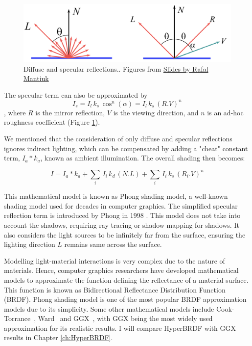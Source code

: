\begin{figure}[h]
  \centering
   \includegraphics[width=0.5\linewidth]{Images/diffuse+specular+angle.pdf}
   \caption{Diffuse and specular reflections.. Figures from \href{https://www.cl.cam.ac.uk/teaching/2223/Graphics/Introduction_to_Graphics_1pp.pdf}{Slides by Rafal Mantiuk}}
   \label{fig:diffuse-spec-angle}
\end{figure}

The specular term can also be approximated by $$I_s = I_l \, k_s \, \cos^n(\alpha) = I_l \, k_s \, (R . V)^n $$, where $R$ is the mirror reflection, $V$ is the viewing direction, and $n$ is an ad-hoc roughness coefficient (Figure \ref{fig:diffuse-spec-angle}).


We mentioned that the consideration of only diffuse and specular reflections ignores indirect lighting, which can be compensated by adding a "cheat" constant term, $I_a * k_a$, known as ambient illumination. The overall shading then becomes:

\begin{equation}
I = I_a * k_a + \sum_i \, I_i \, k_d \, (N . L) + \sum_i \, I_i \, k_s \, (R_i . V)^n
\label{eq:Phong-eq}
\end{equation}

This mathematical model is known as Phong shading model, a well-known shading model used for decades in computer graphics. The simplified specular reflection term is introduced by Phong in 1998 \cite{phong1998illumination}. This model does not take into account the shadows, requiring ray tracing or  shadow mapping for shadows. It also considers the light sources to be infinitely far from the surface, ensuring the lighting direction $L$ remains same across the surface.

Modelling light-material interactions is very complex due to the nature of materials. Hence, computer graphics researchers have developed mathematical models to approximate the function defining the reflectance of a material surface. This function is known as Bidirectional Reflectance Distribution Function (BRDF). Phong shading model is one of the most popular BRDF approximation models due to its simplicity. Some other mathematical models include Cook-Torrance~\cite{cooktorrance1982}, Ward~\cite{ward1992} and GGX~\cite{walter2007microfacet}, with GGX being the most widely used approximation for its realistic results. I will compare HyperBRDF with GGX results in Chapter \ref{ch:HyperBRDF}.

